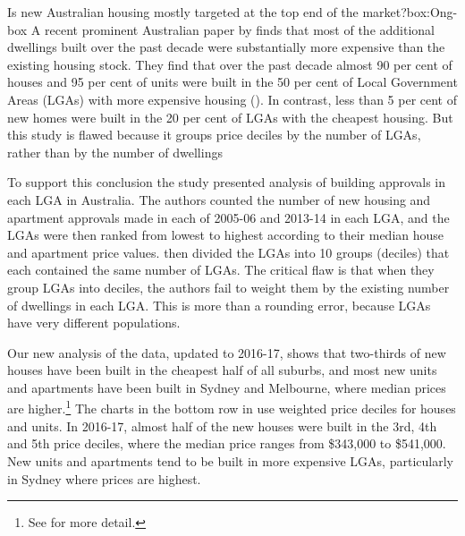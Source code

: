 \begin{bigbox*}{Is new Australian housing mostly targeted at the top end of the market?}{box:Ong-box}
\setlength{\parskip}{9pt}
A recent prominent Australian paper by 
    \textcite{OngEtAl-AHURI-2017-Housing-supply-responsiveness} 
finds that most of the additional dwellings built over the past decade were substantially more expensive than the existing housing stock.%
They find that over the past decade almost 90 per cent of houses and 95 per cent of units were built in the 50 per cent of Local Government Areas (LGAs) with more expensive housing ().
In contrast, less than 5 per cent of new homes were built in the 20 per cent of LGAs with the cheapest housing. But this study is flawed because it groups price deciles by the number of LGAs, rather than by the number of dwellings

To support this conclusion the study presented analysis of building approvals in each LGA in Australia. The authors counted the number of new housing and apartment approvals made in each of 2005-06 and 2013-14 in each LGA, and the LGAs were then ranked from lowest to highest according to their median house and apartment price values.
\textcite[][16]{OngEtAl-AHURI-2017-Housing-supply-responsiveness} then divided the LGAs into 10 groups (deciles) that each contained the same number of LGAs.    
The critical flaw is that when they group LGAs into deciles, the authors fail to weight them by the existing number of dwellings in each LGA\@. This is more than a rounding error, because LGAs have very different populations.

Our new analysis of the data, updated to 2016-17, shows that two-thirds of new houses have been built in the cheapest half of all suburbs, and most new units and apartments have been built in Sydney and Melbourne, where median prices are higher.\footnote{See \textcite{Coates-Wiltshire-2018-InsideStory-conventional-wisdom-wrong} for more detail.} The charts in the bottom row in  use weighted price deciles for houses and units. In 2016-17, almost half of the new houses were built in the 3rd, 4th and 5th price deciles, where the median price ranges from \$343,000 to \$541,000. New units and apartments tend to be built in more expensive LGAs, particularly in Sydney where prices are highest. 


\end{bigbox*}
